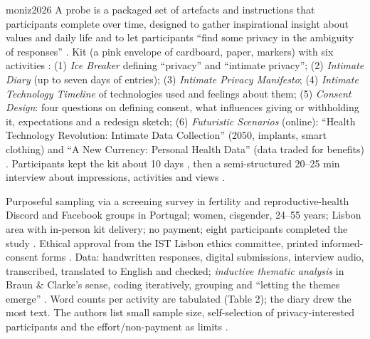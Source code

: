 \begin{papercard}{moniz2026}
 A probe is a packaged set of artefacts and instructions that participants complete over time, designed to gather inspirational insight about values and daily life and to let participants ``find some privacy in the ambiguity of responses'' . Kit (a pink envelope of cardboard, paper, markers) with six activities : (1) \emph{Ice Breaker} defining ``privacy'' and ``intimate privacy''; (2) \emph{Intimate Diary} (up to seven days of entries); (3) \emph{Intimate Privacy Manifesto}; (4) \emph{Intimate Technology Timeline} of technologies used and feelings about them; (5) \emph{Consent Design}: four questions on defining consent, what influences giving or withholding it, expectations and a redesign sketch; (6) \emph{Futuristic Scenarios} (online): ``Health Technology Revolution: Intimate Data Collection'' (2050, implants, smart clothing) and ``A New Currency: Personal Health Data'' (data traded for benefits) . Participants kept the kit about 10 days , then a semi-structured 20--25 min interview about impressions, activities and views .

 Purposeful sampling via a screening survey in fertility and reproductive-health Discord and Facebook groups in Portugal; women, cisgender, 24--55 years; Lisbon area with in-person kit delivery; no payment; eight participants completed the study . Ethical approval from the IST Lisbon ethics committee, printed informed-consent forms . Data: handwritten responses, digital submissions, interview audio, transcribed, translated to English and checked; \emph{inductive thematic analysis} in Braun \& Clarke's sense, coding iteratively, grouping and ``letting the themes emerge'' . Word counts per activity are tabulated (Table 2); the diary drew the most text. The authors list small sample size, self-selection of privacy-interested participants and the effort/non-payment as limits .


\end{papercard}
